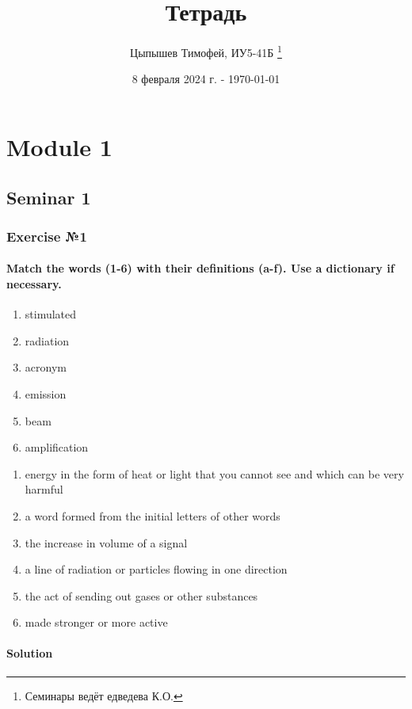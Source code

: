 \documentclass[12pt, a4paper]{report}
\title{Тетрадь}
\author{Цыпышев Тимофей, ИУ5-41Б \thanks{Семинары ведёт едведева К.О.}}
\date{8 февраля 2024 г. - \today}
\begin{document}
\maketitle
\tableofcontents

\part{Module 1}

\chapter{Seminar 1}

\section{Exercise №1}

\subsection{Match the words (1-6) with their definitions (a-f). Use a dictionary if necessary.}
\begin{enumerate}
    \item[1.] stimulated
    \item[2.] radiation
    \item[3.] acronym
    \item[4.] emission
    \item[5.] beam
    \item[6.] amplification
\end{enumerate}

\begin{enumerate}
    \item[a.] energy in the form of heat or light that you cannot see and
        which can be very harmful
    \item[b.] a word formed from the initial letters of other words
    \item[c.] the increase in volume of a signal
    \item[d.] a line of radiation or particles flowing in one direction
    \item[e.] the act of sending out gases or other substances
    \item[f.] made stronger or more active
\end{enumerate}

\subsection{Solution}
\end{document}

